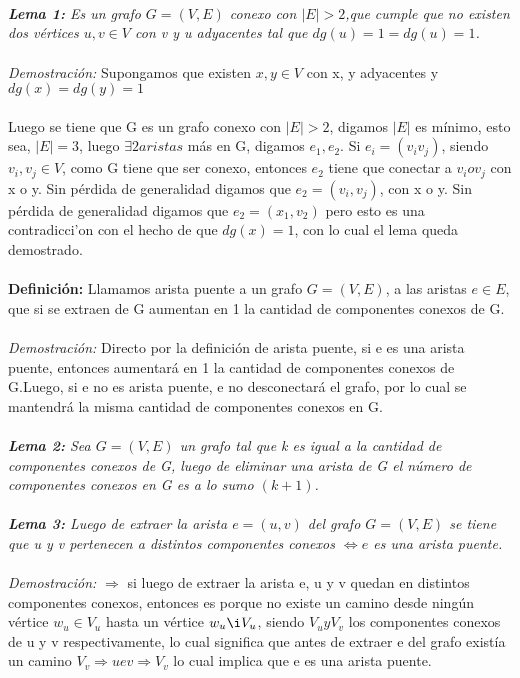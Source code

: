 \documentclass[12pt]{article}
\begin{document}
\\
\\
\\
\textit{ \textbf{Lema 1:} Es un grafo $G= (V,E)$ conexo con $|E|> 2$,que cumple que no existen dos vértices $u,v \in V$ con v y u adyacentes tal que $dg(u) = 1 = dg(u) = 1$.}\\
\\
\textit{Demostración:} Supongamos que existen $x, y \in V$ con x, y adyacentes y $dg(x) = dg(y) = 1$\\
\\
Luego se tiene que G es un grafo conexo con $|E| >2$, digamos $|E|$ es  m\'inimo, esto sea, $|E| = 3$, luego
$\exists 2 aristas$ m\'as en G, digamos $e_1, e_2$.  Si $e_i = (v_i v_j)$, siendo  $v_i, v_j \in V$, como G tiene que ser
conexo, entonces $e_2$ tiene que conectar a $v_i o v_j$ con x o y. Sin p\'erdida de generalidad digamos que
$e_2 = (v_i, v_j)$, con x o y. Sin p\'erdida de generalidad digamos que $e_2 = (x_1, v_2)$ pero esto es una contradicci'on
con el hecho de que $dg(x) = 1$, con lo cual el lema queda demostrado.\\ 
\\
\textbf{Definición:} Llamamos arista puente a un grafo $G  = (V,E)$, a las aristas $e \in E$, que si se extraen de G aumentan en 1 la cantidad de componentes conexos de G.\\
\\
\textit{Demostración:} Directo por la definici\'on de arista puente, si e es una arista puente, entonces  aumentar\'a en 1 la
cantidad de componentes conexos de G.Luego, si e no es arista puente, e no desconectar\'a el grafo, por lo cual se mantendr\'a la misma cantidad de componentes conexos en G.\\
\\ 
\textit{ \textbf{Lema 2:} Sea $G = (V,E)$ un grafo tal que k es igual a la cantidad de componentes conexos de G, luego de eliminar una arista de G el n\'umero de componentes conexos en G es a lo sumo $(k+1)$.}\\
\\
\textit{ \textbf{Lema 3:} Luego de extraer la arista $e = (u,v)$ del grafo $G = (V,E)$ se tiene que u y v pertenecen a distintos componentes conexos $\Leftrightarrow e$ es una arista puente.}\\
\\
\textit{Demostración:} $\Rightarrow$ si luego de extraer la arista e, u y v quedan en distintos componentes conexos, entonces es porque no existe un camino desde ning\'un v\'ertice $w_u \in V_u$ hasta un v\'ertice $w_u \i V_u$, siendo $V_u y V_v$ los componentes conexos de u y v respectivamente, lo cual significa que antes de extraer e del grafo exist\'ia un camino $V_v \Rightarrow uev \Rightarrow V_v$ lo cual implica que e es una arista puente.\\
\end{document}

